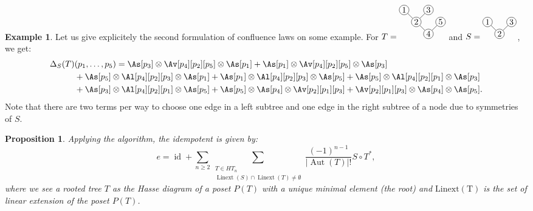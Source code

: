 \documentclass[11pt,leqno]{amsart}
\theoremstyle{definition}
\newtheorem{example}[definition]{Example}
\theoremstyle{plain}
\newtheorem{proposition}[definition]{Proposition}
\begin{document}
\begin{example}
Let us give explicitely the second formulation of confluence laws on some example. For $T= \begin{tikzpicture}[scale=0.5]
\draw(1,1)--(0,0)--(-2,2);
\draw(-1,1)--(0,2);
\draw[fill=white](0,0) circle(0.4);
\draw[fill=white](1,1) circle(0.4);
\draw[fill=white](-1,1) circle(0.4);
\draw[fill=white](0,2) circle(0.4);
\draw[fill=white](-2,2) circle(0.4);
\draw(0,0) node{4};
\draw(1,1) node{5};
\draw(-1,1) node{2};
\draw(0,2) node{3};
\draw(-2,2) node{1};
\end{tikzpicture}$ and $S=\begin{tikzpicture}[scale=0.5]
\draw(1,1)--(0,0)--(-1,1);
\draw[fill=white](0,0) circle(0.4);
\draw[fill=white](1,1) circle(0.4);
\draw[fill=white](-1,1) circle(0.4);
\draw(0,0) node{2};
\draw(1,1) node{3};
\draw(-1,1) node{1};
\end{tikzpicture}$, we get: 
\begin{align*}
\Delta_S(T)&(p_1, \ldots, p_5) = \As[p_3] \otimes \Av[p_4][p_2][p_5] \otimes \As[p_1] + \As[p_1] \otimes \Av[p_4][p_2][p_5] \otimes \As[p_3]   \\
& + \As[p_5] \otimes \Al[p_4][p_2][p_3] \otimes \As[p_1] +\As[p_1] \otimes \Al[p_4][p_2][p_3] \otimes \As[p_5] + \As[p_5] \otimes \Al[p_4][p_2][p_1] \otimes \As[p_3]   \\
& + \As[p_3] \otimes \Al[p_4][p_2][p_1] \otimes \As[p_5] + \As[p_5] \otimes \As[p_4] \otimes \Av[p_2][p_1][p_3] + \Av[p_2][p_1][p_3] \otimes \As[p_4] \otimes \As[p_5].
\end{align*}
Note that there are two terms per way to choose one edge in a left subtree and one edge in the right subtree of a node due to symmetries of $S$.

\end{example}


\begin{proposition}
Applying the algorithm, the idempotent is given by:
\begin{equation*}
e=\operatorname{id} + \sum_{n \geq 2}\sum_{\substack{T \in HT_n \\ \operatorname{Linext}(S) \cap \operatorname{Linext}(T)\neq\emptyset}} \frac{(-1)^{n-1}}{|\operatorname{Aut}(T)|!} S \circ T^*,
\end{equation*}
where we see a rooted tree $T$ as the Hasse diagram of a poset $P(T)$ with a unique minimal element (the root) and $\operatorname{Linext(T)}$ is the set of linear extension of the poset $P(T)$.
\end{proposition}
\end{document}
